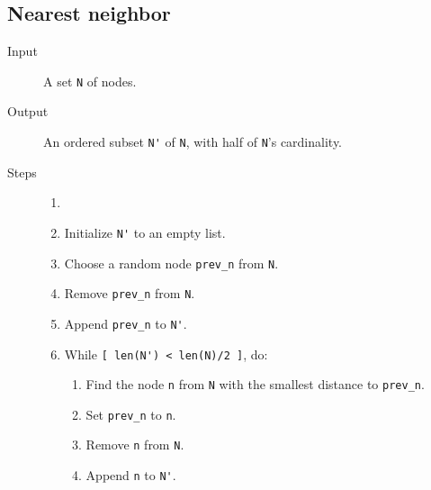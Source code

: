 \documentclass[14pt]{article}
\begin{document}
\subsection{Nearest neighbor}
\begin{description}
	\item [Input] A set \verb`N` of nodes.
	\item [Output] An ordered subset \verb`N'` of \verb`N`, with half of
		\verb`N`'s cardinality.
	\item [Steps]
		\begin{enumerate}\item []
			\item Initialize \verb`N'` to an empty list.
			\item Choose a random node \verb`prev_n` from \verb`N`.
			\item Remove \verb`prev_n` from \verb`N`.
			\item Append \verb`prev_n` to \verb`N'`.
			\item While \verb`[ len(N') < len(N)/2 ]`, do:
				\begin{enumerate}
					\item Find the node \verb`n` from \verb`N` with the
						smallest distance to \verb`prev_n`.
					\item Set \verb`prev_n` to \verb`n`.
					\item Remove \verb`n` from \verb`N`.
					\item Append \verb`n` to \verb`N'`.
				\end{enumerate}
		\end{enumerate}
\end{description}
\end{document}
